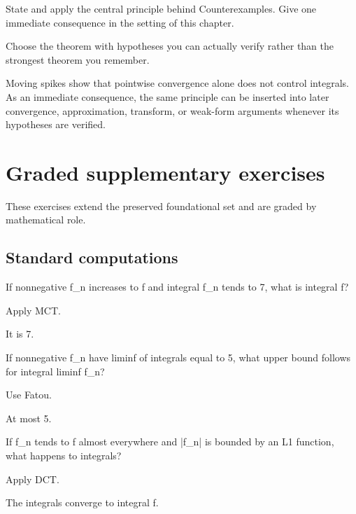\begin{exercise}\label{exr:iii04-08}
State and apply the central principle behind Counterexamples. Give one immediate consequence in the setting of this chapter.
\end{exercise}
\begin{hint}
Choose the theorem with hypotheses you can actually verify rather than the strongest theorem you remember.
\end{hint}
\begin{solution}
Moving spikes show that pointwise convergence alone does not control integrals. As an immediate consequence, the same principle can be inserted into later convergence, approximation, transform, or weak-form arguments whenever its hypotheses are verified.
\end{solution}


\section{Graded supplementary exercises}
These exercises extend the preserved foundational set and are graded by mathematical role.

\subsection*{Standard computations}

\begin{exercise}\label{exr:iii04-expand-01}
If nonnegative f\_n increases to f and integral f\_n tends to 7, what is integral f?
\end{exercise}
\begin{hint}
Apply MCT.
\end{hint}
\begin{solution}
It is 7.
\end{solution}

\begin{exercise}[Fatou]\label{exr:iii04-expand-02}
If nonnegative f\_n have liminf of integrals equal to 5, what upper bound follows for integral liminf f\_n?
\end{exercise}
\begin{hint}
Use Fatou.
\end{hint}
\begin{solution}
At most 5.
\end{solution}

\begin{exercise}[DCT]\label{exr:iii04-expand-03}
If f\_n tends to f almost everywhere and |f\_n| is bounded by an L1 function, what happens to integrals?
\end{exercise}
\begin{hint}
Apply DCT.
\end{hint}
\begin{solution}
The integrals converge to integral f.
\end{solution}

